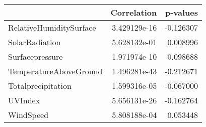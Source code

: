 \begin{tabular}{lrr}
\toprule
{} &   Correlation &  p-values \\
\midrule
RelativeHumiditySurface &  3.429129e-16 & -0.126307 \\
SolarRadiation          &  5.628132e-01 &  0.008996 \\
Surfacepressure         &  1.971974e-10 &  0.098688 \\
TemperatureAboveGround  &  1.496281e-43 & -0.212671 \\
Totalprecipitation      &  1.599316e-05 & -0.067000 \\
UVIndex                 &  5.656131e-26 & -0.162764 \\
WindSpeed               &  5.808188e-04 &  0.053448 \\
\bottomrule
\end{tabular}
